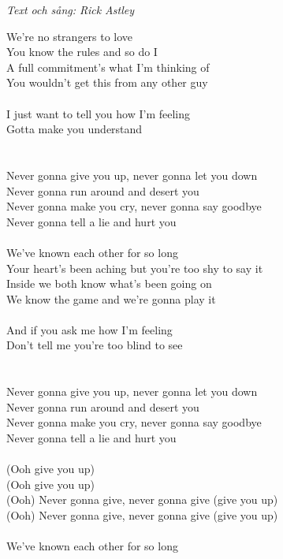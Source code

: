 {\footnotesize\textit{Text och sång: Rick Astley}}\par
\vspace{10pt}
We're no strangers to love\\
You know the rules and so do I\\
A full commitment's what I'm thinking of\\
You wouldn't get this from any other guy\\
\\
I just want to tell you how I'm feeling\\
Gotta make you understand\\
\\
[Chorus:]\\
Never gonna give you up, never gonna let you down\\
Never gonna run around and desert you\\
Never gonna make you cry, never gonna say goodbye\\
Never gonna tell a lie and hurt you\\
\\
We've known each other for so long\\
Your heart's been aching but you're too shy to say it\\
Inside we both know what's been going on\\
We know the game and we're gonna play it\\
\\
And if you ask me how I'm feeling \\
Don't tell me you're too blind to see\\
\\
[Chorus x2]\\
Never gonna give you up, never gonna let you down\\
Never gonna run around and desert you\\
Never gonna make you cry, never gonna say goodbye\\
Never gonna tell a lie and hurt you\\
\\
(Ooh give you up)\\
(Ooh give you up)\\
(Ooh) Never gonna give, never gonna give (give you up)\\
(Ooh) Never gonna give, never gonna give (give you up)\\
\\
We've known each other for so long\\

